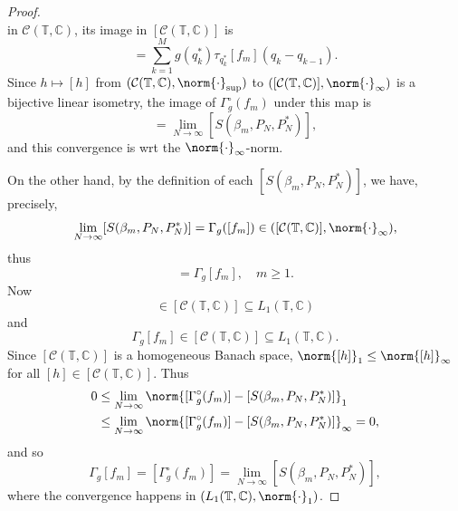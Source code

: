 \documentclass[notoc,notitlepage]{tufte-book}
\begin{document}
\begin{proof}
\begin{equation*}
  \end{equation*}
  in $\mathcal{C}(\mathbb{T}, \mathbb{C})$, its image in
  $[\mathcal{C}(\mathbb{T}, \mathbb{C})]$ is
  \begin{equation*}
    [S(\beta_m, Q, Q^*)] = \sum_{k=1}^{M} g(q_k^*) \tau_{q_k^*}[f_m](q_k - q_{k-1}).
  \end{equation*}
  Since $h \mapsto [h]$ from
  $(\mathcal{C}(\mathbb{T}, \mathbb{C}), \norm{\cdot}_{\sup})$ to
  $([\mathcal{C}(\mathbb{T}, \mathbb{C})], \norm{\cdot}_{\infty})$
  is a bijective linear isometry, the image of $\Gamma_g^\circ(f_m)$
  under this map is
  \begin{equation*}
    [\Gamma_g^\circ(f_m)] = \lim_{N \to \infty} [S(\beta_m, P_N, P_N^*)],
  \end{equation*}
  and this convergence is wrt the $\norm{\cdot}_{\infty}$-norm.

  On the other hand, by the definition of each $[S(\beta_m, P_N, P_N^*)]$,
  we have, precisely,
  \begin{equation*}
    \lim_{N \to \infty} [S(\beta_m, P_N, P_N^*)] = \Gamma_g([f_m])
    \in ([\mathcal{C}(\mathbb{T}, \mathbb{C})], \norm{\cdot}_{\infty}),
  \end{equation*}
  thus
  \begin{equation*}
    [\Gamma_g^\circ(f_m)] = \Gamma_g[f_m], \quad m \geq 1.
  \end{equation*}
  Now
  \begin{equation*}
    [S(\beta_m,P_N,P_N^*)]
      \in [\mathcal{C}(\mathbb{T},\mathbb{C})] \subseteq L_1(\mathbb{T},\mathbb{C})
  \end{equation*}
  and
  \begin{equation*}
    \Gamma_g[f_m]
    \in [\mathcal{C}(\mathbb{T},\mathbb{C})] \subseteq L_1(\mathbb{T},\mathbb{C}).
  \end{equation*}
  Since $[\mathcal{C}(\mathbb{T},\mathbb{C})]$ is a homogeneous Banach space,
  $\norm{[h]}_1 \leq \norm{[h]}_{\infty}$ for all $[h] \in
  [\mathcal{C}(\mathbb{T},\mathbb{C})]$.
  Thus
  \begin{align*}
    0 &\leq \lim_{N \to \infty}
        \norm{[\Gamma_g^{\circ}(f_m)] - [S(\beta_m,P_N,P_N^*)]}_1 \\
      &\leq \lim_{N \to \infty}
        \norm{[\Gamma_g^\circ(f_m)] - [S(\beta_m,P_N,P_N^*)]}_{\infty}
       = 0,
  \end{align*}
  and so
  \begin{equation*}
    \Gamma_g[f_m] = [\Gamma_g^\circ(f_m)]
    = \lim_{N \to \infty} [S(\beta_m, P_N, P_N^*)],
  \end{equation*}
  where the convergence happens in $(L_1(\mathbb{T}, \mathbb{C}), \norm{\cdot}_1)$.


\end{proof}
\end{document}
